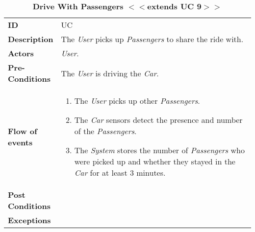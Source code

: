 \begin{longtable}{|p{0.2\linewidth} | p{0.8\linewidth}|}
	\captionsetup{labelformat=empty} %
	\caption{\textbf{Drive With Passengers $<<$extends UC 9$>>$}} %
	\label{UC_DriveWithPassengers}%
	\\ \hline %
	
	\textbf{ID} & UC\theUseCaseIdCounter \\ \hline
	\textbf{Description} & The \emph{User} picks up \emph{Passengers} to share the ride with. \\ \hline
	\textbf{Actors} & \emph{User}.\\ \hline
	\textbf{Pre-Conditions} & The \emph{User} is driving the \emph{Car}. \\ \hline
	\textbf{Flow of events} & 
	\begin{enumerate}
		\item The \emph{User} picks up other \emph{Passengers}.
		\item The \emph{Car} sensors detect the presence and number of the \emph{Passengers}.
		\item The \emph{System} stores the number of \emph{Passengers} who were picked up and whether they stayed in the \emph{Car} for at least 3 minutes.
	\end{enumerate}	 \\ \hline
	\textbf{Post Conditions} & \\ \hline
	\textbf{Exceptions} & \\ \hline
\end{longtable}

